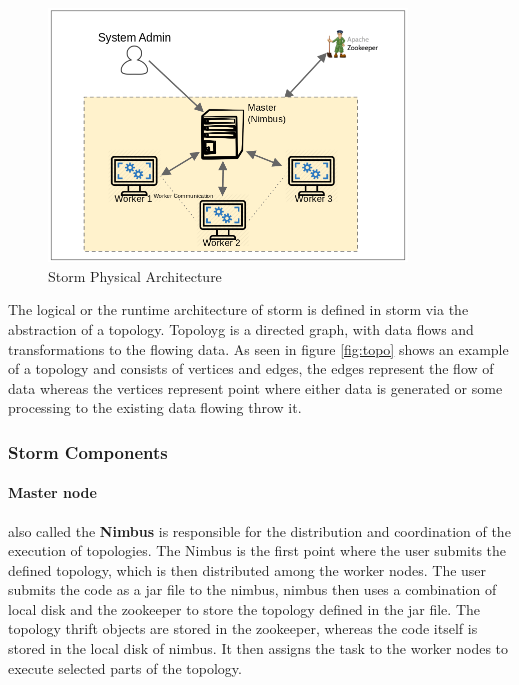 \documentclass[runningheads,a4paper]{llncs}[2015/06/24]
\begin{document}
\begin{figure}
  \begin{center}
    \includegraphics[width=0.85\textwidth]{arch.png}
    \caption{Storm Physical Architecture}
    \label{fig:physicalarc}
   \end{center}
\end{figure}

The logical or the runtime architecture of storm is defined in storm via the abstraction of a topology. Topoloyg is a directed graph, with data flows and transformations to the flowing data. As seen in figure \ref{fig:topo} shows an example of a topology and consists of vertices and edges, the edges represent the flow of data whereas the vertices represent point where either data is generated or some processing to the existing data flowing throw it.

\subsubsection{Storm Components}
\paragraph{Master node} also called the \textbf{Nimbus} is responsible for the distribution and coordination of the execution of topologies. The Nimbus is the first point where the user submits the defined topology, which is then distributed among the worker nodes. The user submits the code as a jar file to the nimbus, nimbus then uses a combination of local disk and the zookeeper to store the topology defined in the jar file.\cite{stormtwitter} The topology thrift objects are stored in the zookeeper, whereas the code itself is stored in the local disk of nimbus. It then assigns the task to the worker nodes to execute selected parts of the topology.
\end{document}
